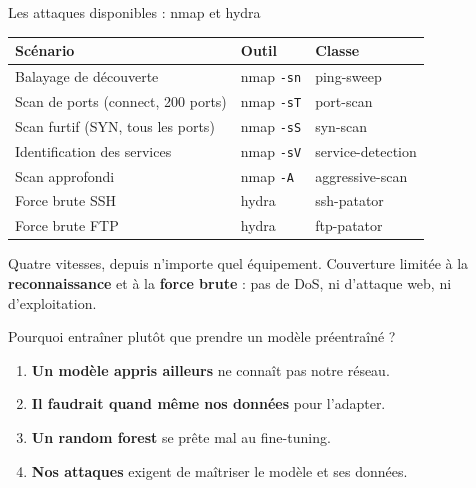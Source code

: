 \documentclass[aspectratio=169,11pt,xcolor=table]{beamer}
\newcommand{\espacement}{\setlength{\itemsep}{.7em}}
\begin{document}
\begin{frame}{Les attaques disponibles : nmap et hydra}
  \small
  \renewcommand{\arraystretch}{1.2}
  \begin{tabularx}{\linewidth}{@{}Xp{.14\linewidth}p{.22\linewidth}@{}}
    \toprule
    \textbf{Scénario} & \textbf{Outil} & \textbf{Classe} \\
    \midrule
    Balayage de découverte & nmap \texttt{-sn} & ping-sweep \\
    Scan de ports (connect, 200 ports) & nmap \texttt{-sT} & port-scan \\
    Scan furtif (SYN, tous les ports) & nmap \texttt{-sS} & syn-scan \\
    Identification des services & nmap \texttt{-sV} & service-detection \\
    Scan approfondi & nmap \texttt{-A} & aggressive-scan \\
    Force brute SSH & hydra & ssh-patator \\
    Force brute FTP & hydra & ftp-patator \\
    \bottomrule
  \end{tabularx}
  \vfill
  \normalsize
  Quatre vitesses, depuis n'importe quel équipement. Couverture limitée à la \textbf{reconnaissance} et à la \textbf{force brute} : pas de DoS, ni d'attaque web, ni d'exploitation.
\end{frame}

\begin{frame}{Pourquoi entraîner plutôt que prendre un modèle préentraîné ?}
  \begin{enumerate}\espacement
    \item \textbf{Un modèle appris ailleurs} ne connaît pas notre réseau.
    \item \textbf{Il faudrait quand même nos données} pour l'adapter.
    \item \textbf{Un random forest} se prête mal au fine-tuning.
    \item \textbf{Nos attaques} exigent de maîtriser le modèle et ses données.
  \end{enumerate}
\end{frame}
\end{document}
